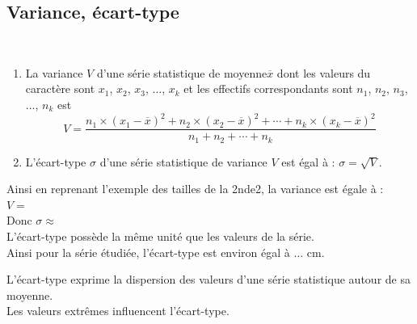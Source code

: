 \subsection{Variance, écart-type}

\begin{Définition} $ $\\

\begin{enumerate}
\item La variance $V$ d'une série statistique de moyenne$\overline{x}$ dont les valeurs du caractère sont $x_1$, $x_2$, $x_3$, ..., $x_k$ et les effectifs correspondants sont $n_1$, $n_2$, $n_3$, ..., $n_k$ est $$V=\dfrac{n_1\times (x_1-\overline{x})^2+n_2\times (x_2-\overline{x})^2+\cdots+n_k\times (x_k-\overline{x})^2}{n_1+n_2+\cdots+n_k}$$

\item L'écart-type $\sigma$ d'une série statistique de variance $V$ est égal à : $\sigma =\sqrt{V}$.
\end{enumerate}
\end{Définition}

\begin{Exemple}
Ainsi en reprenant l'exemple des tailles de la 2nde2, la variance est égale à : \\

$V=$ \\

Donc $\sigma\approx$\\
L'écart-type possède la même unité que les valeurs de la série. \\
Ainsi pour la série étudiée, l'écart-type est environ égal à $\dots$ cm.
\end{Exemple}

\begin{Remarque}
L'écart-type exprime la dispersion des valeurs d'une série statistique autour de sa moyenne. \\
Les valeurs extrêmes influencent l'écart-type.

\end{Remarque}

\bigskip

\newpage

